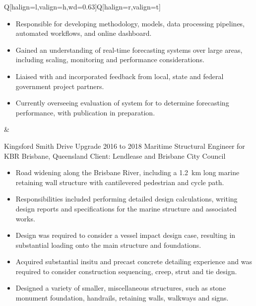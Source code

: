 \begin{table}[h!]
\begin{tblr}{Q[halign=l,valign=h,wd=0.63\textwidth]Q[halign=r,valign=t]}
{{\begin{itemize}
		\item Responsible for developing methodology, models, data processing pipelines, automated workflows, and online dashboard.
		\item Gained an understanding of real-time forecasting systems over large areas, including scaling, monitoring and performance considerations.
		\item Liaised with and incorporated feedback from local, state and federal government project partners.
		\item Currently overseeing evaluation of system for to determine forecasting performance, with publication in preparation.
	 \end{itemize}}
	} &  \\
	{\entrytableprojecthighlight%
	{Kingsford Smith Drive Upgrade}
	{2016 to 2018}
	{}
	{Maritime Structural Engineer for KBR}
	{Brisbane, Queensland}
	{Client: Lendlease and Brisbane City Council}
	{\vspace{1em}\begin{itemize}
		 \item Road widening along the Brisbane River, including a \SI{1.2}{\km} long marine retaining wall structure with cantilevered pedestrian and cycle path.
		 \item Responsibilities included performing detailed design calculations, writing design reports and specifications for the marine structure and associated works.
		 \item Design was required to consider a vessel impact design case, resulting in substantial loading onto the main structure and foundations.
		 \item Acquired substantial insitu and precast concrete detailing experience and was required to consider construction sequencing, creep, strut and tie design.
		 \item Designed a variety of smaller, miscellaneous structures, such as stone monument foundation, handrails, retaining walls, walkways and signs.  

\end{itemize}}}
\end{tblr}
\end{table}
